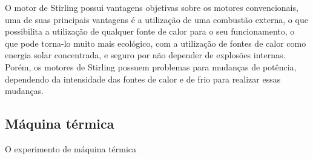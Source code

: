 O motor de Stirling possui vantagens objetivas sobre os motores convencionais, uma de suas principais vantagens é a utilização de uma combustão externa, o que possibilita a utilização de qualquer fonte de calor para o seu funcionamento, o que pode torna-lo muito mais ecológico, com a utilização de fontes de calor como energia solar concentrada, e seguro por não depender de explosões internas. Porém, os motores de Stirling possuem problemas para mudanças de potência, dependendo da intensidade das fontes de calor e de frio para realizar essas mudanças. 

\subsection{Máquina térmica} %
O experimento de máquina térmica

